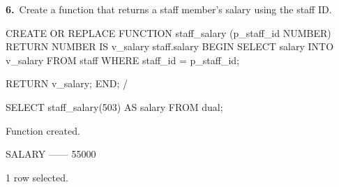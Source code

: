 \noindent\begin{minipage}{\linewidth}
\begingroup{}
{\fontsize{14}{17}\selectfont\textbf{6.}}\ Create a function that returns a staff member's salary using the staff ID.\par
\endgroup\vspace{12pt}


\begin{sqlcode}
CREATE OR REPLACE FUNCTION staff_salary (p_staff_id NUMBER)
RETURN NUMBER
IS
   v_salary staff.salary%
BEGIN
   SELECT salary INTO v_salary
   FROM staff
   WHERE staff_id = p_staff_id;

   RETURN v_salary;
END;
/

SELECT staff_salary(503) AS salary FROM dual;
\end{sqlcode}

\vspace{18pt}


\begin{sqlout}[fontsize=\small]
Function created.

SALARY
------
 55000

1 row selected.
\end{sqlout}
\end{minipage}\par\vspace{24pt}

